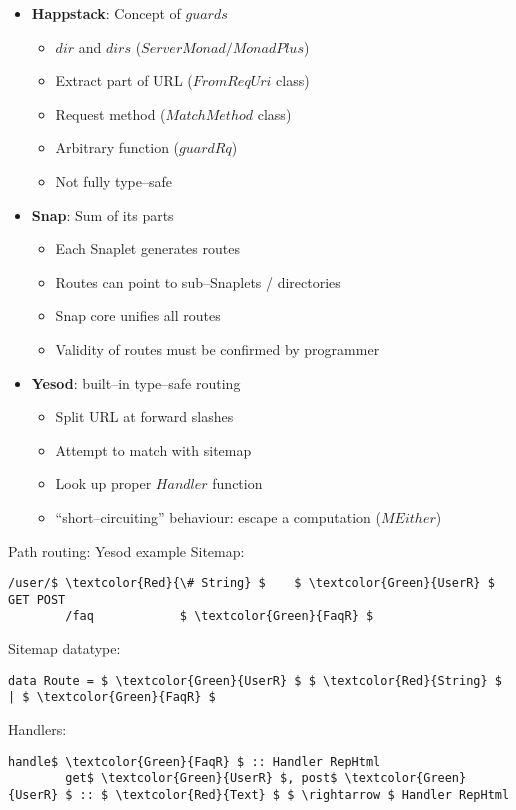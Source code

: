 \documentclass[10pt,usenames,dvipsnames]{beamer}
\begin{document}
	\begin{frame}
		\begin{itemize}
		\item \textbf{Happstack}: Concept of $ guards $
		\begin{itemize}
			\item $ dir $ and $ dirs $ ($ ServerMonad / MonadPlus $)
			\item Extract part of URL ($ FromReqUri $ class)
			\item Request method ($ MatchMethod $ class)
			\item Arbitrary function ($ guardRq $)
			\item Not fully type--safe
		\end{itemize}
		\item\textbf{Snap}: Sum of its parts
		\begin{itemize}
			\item Each Snaplet generates routes
			\item Routes can point to sub--Snaplets / directories
			\item Snap core unifies all routes
			\item Validity of routes must be confirmed by programmer
		\end{itemize}
		\item \textbf{Yesod}: built--in type--safe routing
		\begin{itemize}
			\item Split URL at forward slashes
			\item Attempt to match with sitemap
			\item Look up proper $ Handler $ function
			\item ``short--circuiting'' behaviour: escape a computation ($ MEither $)
		\end{itemize}
		\end{itemize}
	\end{frame}

	\begin{frame}[fragile]{Path routing: Yesod example}
		Sitemap:
		\begin{lstlisting}[mathescape=true]
		/user/$ \textcolor{Red}{\# String} $	$ \textcolor{Green}{UserR} $		GET POST
		/faq	        $ \textcolor{Green}{FaqR} $
		\end{lstlisting}
		Sitemap datatype:
		\begin{lstlisting}[mathescape=true]
		data Route = $ \textcolor{Green}{UserR} $ $ \textcolor{Red}{String} $ | $ \textcolor{Green}{FaqR} $
		\end{lstlisting}
		Handlers:
		\begin{lstlisting}[mathescape=true]
		handle$ \textcolor{Green}{FaqR} $ :: Handler RepHtml
		get$ \textcolor{Green}{UserR} $, post$ \textcolor{Green}{UserR} $ :: $ \textcolor{Red}{Text} $ $ \rightarrow $ Handler RepHtml
		\end{lstlisting}

	\end{frame}
\end{document}
